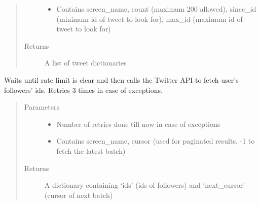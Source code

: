 \documentclass[letterpaper,10pt,english]{sphinxmanual}
\begin{document}
\begin{fulllineitems}
\begin{fulllineitems}
\begin{quote}
\begin{description}
\begin{itemize}
\item {} 
 \textendash{} Contains screen\_name, count (maximum 200 allowed), since\_id (minimum id of tweet to look for), max\_id (maximum id of tweet to look for)

\end{itemize}

\item[{Returns}] \leavevmode
A list of tweet dictionaries

\end{description}\end{quote}

\end{fulllineitems}


\begin{fulllineitems}
\label{\detokenize{twitter_stream:userstimeline.UserTimelineAPI.my_followers_fetcher}}
Waits until rate limit is clear and then calls the Twitter API to fetch user’s followers’ ids.
Retries 3 times in case of exceptions.
\begin{quote}\begin{description}
\item[{Parameters}] \leavevmode\begin{itemize}
\item {} 
 \textendash{} Number of retries done till now in case of exceptions

\item {} 
 \textendash{} Contains screen\_name, cursor (used for paginated results, -1 to fetch the latest batch)

\end{itemize}

\item[{Returns}] \leavevmode
A dictionary containing ‘ids’ (ids of followers) and ‘next\_cursor’ (cursor of next batch)

\end{description}\end{quote}

\end{fulllineitems}



\end{fulllineitems}
\end{document}
